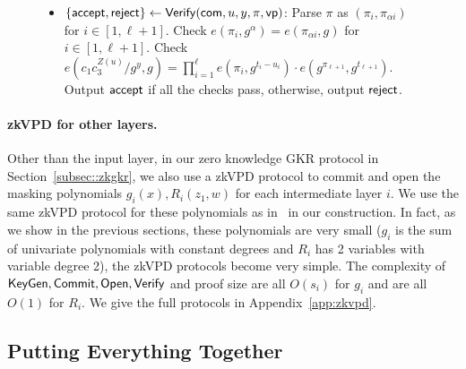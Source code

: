 \begin{figure}[H]
{{{{\begin{construction}
\begin{itemize}
							\item $\{\mathsf{accept},\mathsf{reject}\}\leftarrow\mathsf{Verify}({{\sf com}},u,y,\pi,\mathsf{vp})$: Parse $\pi$ as $(\pi_i,\pi_{\alpha i})$ for $i\in[1,\ell+1]$. Check $e(\pi_i,g^\alpha) = e(\pi_{\alpha i},g)$ for $i\in[1,\ell+1]$. Check $e(c_1c_3^{Z(u)}/g^y, g) = \prod_{i=1}^\ell e(\pi_i, g^{t_i-u_i}) \cdot e(g^{\pi_{\ell+1}},g^{t_{\ell+1}})$. Output $\mathsf{accept}$ if all the checks pass, otherwise, output $\mathsf{reject}$.
							
							
						\end{itemize} 
						
	\end{construction}}}}}
\end{figure}

\paragraph{zkVPD for other layers.}
Other than the input layer, in our zero knowledge GKR protocol in Section~\ref{subsec::zkgkr}, we also use a zkVPD protocol to commit and open the masking polynomials $g_i(x), R_i(z_1, w)$ for each intermediate layer $i$. We use the same zkVPD protocol for these polynomials as in~\cite{zkvpd} in our construction. In fact, as we show in the previous sections, these polynomials are very small ($g_i$ is the sum of univariate polynomials with constant degrees and $R_i$ has 2 variables with variable degree 2), the zkVPD protocols become very simple. The complexity of $\mathsf{KeyGen}, \mathsf{Commit}, \mathsf{Open}, \mathsf{Verify}$ and proof size are all $O(s_i)$ for $g_i$ and are all $O(1)$ for $R_i$. We give the full protocols in Appendix~\ref{app:zkvpd}.


\subsection{Putting Everything Together}\label{subsec::zkall}

